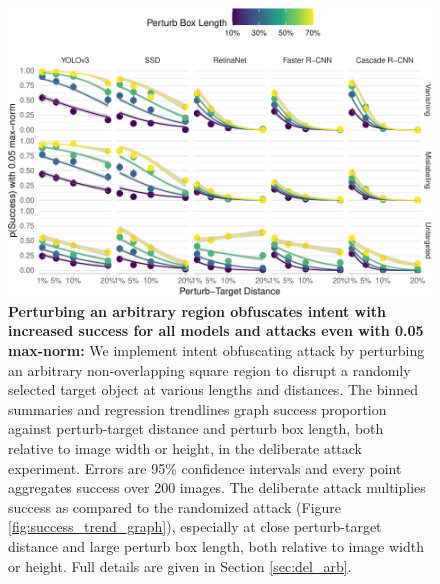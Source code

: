 \begin{figure}[tb]

{\centering \includegraphics[width=1\linewidth]{imgs/arbitrary_trend_graph_normed} 

}

\caption{\textbf{Perturbing an arbitrary region obfuscates intent with increased success for all models and attacks even with 0.05 max-norm:}  We implement intent obfuscating attack by perturbing an arbitrary non-overlapping square region to disrupt a randomly selected target object at various lengths and distances. The binned summaries and regression trendlines graph success proportion against perturb-target distance and perturb box length, both relative to image width or height, in the deliberate attack experiment. Errors are 95\% confidence intervals and every point aggregates success over 200 images. The deliberate attack multiplies success as compared to the randomized attack (Figure \ref{fig:success_trend_graph}), especially at close perturb-target distance and large perturb box length, both relative to image width or height. Full details are given in Section \ref{sec:del_arb}.}\label{fig:arbitrary_trend_graph_normed}
\end{figure}

\begingroup\fontsize{9}{11}\selectfont

